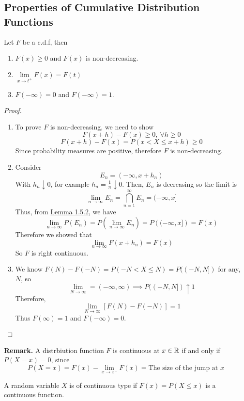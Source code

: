 \subsection{Properties of Cumulative Distribution Functions}
\begin{theorem}
    
    Let $F$ be a c.d.f, then
    \begin{enumerate}[label=(\roman*)]
        \item $F(x) \geq 0$ and $F(x)$ is non-decreasing.
        \item $\lim\limits_{x\rightarrow t^+}F(x) = F(t)$
        \item $F(-\infty) = 0$ and $F(-\infty)= 1$.
    \end{enumerate}
\end{theorem}
\begin{proof}
    \begin{enumerate}[label=(\roman*)]
        \item  To prove $F$ is non-decreasing, we need to show 
        \[F(x + h) - F(x) \geq 0, \ \forall h \geq 0\]
        \[F(x + h) - F(x) = P(x < X \leq x+h) \geq 0\]
        Since probability measures are positive, therefore $F$ is non-decreasing.
        \item Consider 
        \[E_n = (-\infty, x + h_n)\]
        With $h_n \downarrow 0$, for example $h_n = \frac{1}{n} \downarrow 0$.  Then, $E_n$ is decreasing so the limit is 
        \[\lim_{n\rightarrow \infty} E_n = \bigcap_{n=1}^\infty E_n = (-\infty, x]\]
        Thus, from \hyperref[lem:1.5.2]{Lemma 1.5.2}, we have
        \[\lim_{n\rightarrow \infty} P(E_n) = P\left(\lim_{n\rightarrow\infty} E_n\right) = P\left((-\infty, x]\right) = F(x)\]
        Therefore we showed that 
        \[\lim_{n\rightarrow\infty} F(x + h_n) = F(x)\]
        So $F$ is right continuous.
        \item We know $F(N) - F(-N) = P(-N < X \leq N) = P((-N,N])$ for any, $N$, so 
        \[\lim_{N \rightarrow \infty} = (-\infty,\infty) \implies P((-N,N])\uparrow 1\]
        Therefore,
        \[\lim_{N\rightarrow \infty} [F(N) - F(-N)] = 1 \]
        Thus $F(\infty) = 1$ and $F(-\infty) = 0$.
    \end{enumerate}
\end{proof}
\noindent
\textbf{Remark.} A distrbiution function $F$ is continuous at $x \in \mathbb{R}$ if and only if $P(X = x) = 0$, since 
\[P(X=x) = F(x) - \lim_{x \rightarrow x^-}F(x) = \text{The size of the jump at $x$}\]
\begin{definition}
    A random variable $X$ is of continuous type if $F(x) = P(X \leq x)$ is a continuous function. 
\end{definition}
